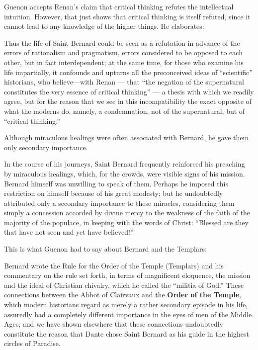 Guenon accepts Renan's claim that critical thinking refutes the intellectual intuition. However, that just shows that critical thinking is itself refuted, since it cannot lead to any knowledge of the higher things. He elaborates:

\begin{quotex}
Thus the life of Saint Bernard could be seen as a refutation in advance of the errors of rationalism and pragmatism, errors considered to be opposed to each other, but in fact interdependent; at the same time, for those who examine his life impartially, it confounds and upturns all the preconceived ideas of ``scientific'' historians, who believe---with Renan --- that ``the negation of the supernatural constitutes the very essence of critical thinking'' --- a thesis with which we readily agree, but for the reason that we see in this incompatibility the exact opposite of what the moderns do, namely, a condemnation, not of the supernatural, but of ``critical thinking.''
\end{quotex}


Although miraculous healings were often associated with Bernard, he gave them only secondary importance.

\begin{quotex}
In the course of his journeys, Saint Bernard frequently reinforced his preaching by miraculous healings, which, for the crowds, were visible signs of his mission. Bernard himself was unwilling to speak of them. Perhaps he imposed this restriction on himself because of his great modesty; but he undoubtedly attributed only a secondary importance to these miracles, considering them simply a concession accorded by divine mercy to the weakness of the faith of the majority of the populace, in keeping with the words of Christ: ``Blessed are they that have not seen and yet have believed!''
\end{quotex}


This is what Guenon had to say about Bernard and the Templars:

\begin{quotex}
Bernard wrote the Rule for the Order of the Temple (Templars) and his commentary on the rule set forth, in terms of magnificent eloquence, the mission and the ideal of Christian chivalry, which he called the ``militia of God.'' These connections between the Abbot of Clairvaux and the \textbf{Order of the Temple}, which modern historians regard as merely a rather secondary episode in his life, assuredly had a completely different importance in the eyes of men of the Middle Ages; and we have shown elsewhere that these connections undoubtedly constitute the reason that Dante chose Saint Bernard as his guide in the highest circles of Paradise.
\end{quotex}


